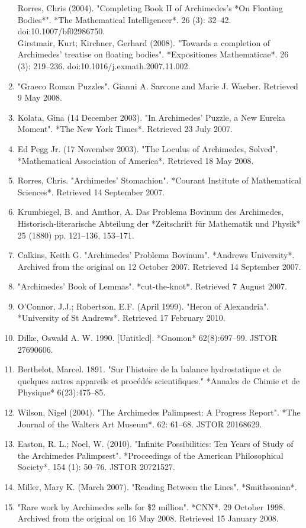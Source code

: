 \begin{enumerate}
Rorres, Chris (2004). "Completing Book II of Archimedes's *On Floating Bodies*". *The Mathematical Intelligencer*. 26 (3): 32–42. doi:10.1007/bf02986750.\\
Girstmair, Kurt; Kirchner, Gerhard (2008). "Towards a completion of Archimedes' treatise on floating bodies". *Expositiones Mathematicae*. 26 (3): 219–236. doi:10.1016/j.exmath.2007.11.002.
\item "Graeco Roman Puzzles". Gianni A. Sarcone and Marie J. Waeber. Retrieved 9 May 2008.
\item Kolata, Gina (14 December 2003). "In Archimedes' Puzzle, a New Eureka Moment". *The New York Times*. Retrieved 23 July 2007.
\item Ed Pegg Jr. (17 November 2003). "The Loculus of Archimedes, Solved". *Mathematical Association of America*. Retrieved 18 May 2008.
\item Rorres, Chris. "Archimedes' Stomachion". *Courant Institute of Mathematical Sciences*. Retrieved 14 September 2007.
\item Krumbiegel, B. and Amthor, A. Das Problema Bovinum des Archimedes, Historisch-literarische Abteilung der *Zeitschrift für Mathematik und Physik* 25 (1880) pp. 121–136, 153–171.
\item Calkins, Keith G. "Archimedes' Problema Bovinum". *Andrews University*. Archived from the original on 12 October 2007. Retrieved 14 September 2007.
\item "Archimedes' Book of Lemmas". *cut-the-knot*. Retrieved 7 August 2007.
\item O'Connor, J.J.; Robertson, E.F. (April 1999). "Heron of Alexandria". *University of St Andrews*. Retrieved 17 February 2010.
\item Dilke, Oswald A. W. 1990. [Untitled]. *Gnomon* 62(8):697–99. JSTOR 27690606.
\item Berthelot, Marcel. 1891. "Sur l'histoire de la balance hydrostatique et de quelques autres appareils et procédés scientifiques." *Annales de Chimie et de Physique* 6(23):475–85.
\item Wilson, Nigel (2004). "The Archimedes Palimpsest: A Progress Report". *The Journal of the Walters Art Museum*. 62: 61–68. JSTOR 20168629.
\item Easton, R. L.; Noel, W. (2010). "Infinite Possibilities: Ten Years of Study of the Archimedes Palimpsest". *Proceedings of the American Philosophical Society*. 154 (1): 50–76. JSTOR 20721527.
\item Miller, Mary K. (March 2007). "Reading Between the Lines". *Smithsonian*.
\item "Rare work by Archimedes sells for \$2 million". *CNN*. 29 October 1998. Archived from the original on 16 May 2008. Retrieved 15 January 2008.
\end{enumerate}